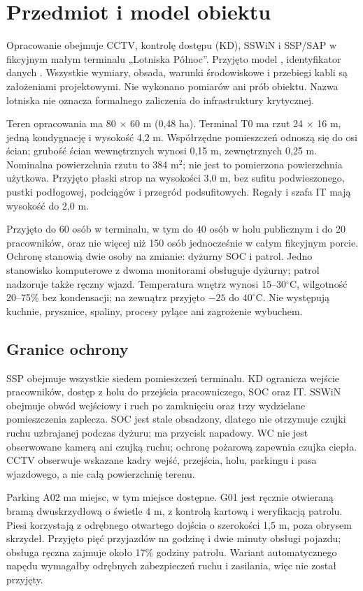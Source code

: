 \section{Przedmiot i model obiektu}
Opracowanie obejmuje CCTV, kontrolę dostępu (KD), SSWiN i SSP/SAP w fikcyjnym małym terminalu „Lotniska Północ”. Przyjęto model \ModelRevision{}, identyfikator danych \texttt{\ModelHash{}}. Wszystkie wymiary, obsada, warunki środowiskowe i przebiegi kabli są założeniami projektowymi. Nie wykonano pomiarów ani prób obiektu. Nazwa lotniska nie oznacza formalnego zaliczenia do infrastruktury krytycznej.

Teren opracowania ma 80 $\times$ 60 m (0,48 ha). Terminal T0 ma rzut 24 $\times$ 16 m, jedną kondygnację i wysokość 4,2 m. Współrzędne pomieszczeń odnoszą się do osi ścian; grubość ścian wewnętrznych wynosi 0,15 m, zewnętrznych 0,25 m. Nominalna powierzchnia rzutu to 384 m$^2$; nie jest to pomierzona powierzchnia użytkowa. Przyjęto płaski strop na wysokości 3,0 m, bez sufitu podwieszonego, pustki podłogowej, podciągów i przegród podsufitowych. Regały i szafa IT mają wysokość do 2,0 m.

Przyjęto do 60 osób w terminalu, w tym do 40 osób w holu publicznym i do 20 pracowników, oraz nie więcej niż 150 osób jednocześnie w całym fikcyjnym porcie. Ochronę stanowią dwie osoby na zmianie: dyżurny SOC i patrol. Jedno stanowisko komputerowe z dwoma monitorami obsługuje dyżurny; patrol nadzoruje także ręczny wjazd. Temperatura wnętrz wynosi 15--30$^\circ$C, wilgotność 20--75\% bez kondensacji; na zewnątrz przyjęto $-25$ do $40^\circ$C. Nie występują kuchnie, prysznice, spaliny, procesy pylące ani zagrożenie wybuchem.

\ModelRooms

\subsection*{Granice ochrony}
SSP obejmuje wszystkie siedem pomieszczeń terminalu. KD ogranicza wejście pracowników, dostęp z holu do przejścia pracowniczego, SOC oraz IT. SSWiN obejmuje obwód wejściowy i ruch po zamknięciu oraz trzy wydzielane pomieszczenia zaplecza. SOC jest stale obsadzony, dlatego nie otrzymuje czujki ruchu uzbrajanej podczas dyżuru; ma przycisk napadowy. WC nie jest obserwowane kamerą ani czujką ruchu; ochronę pożarową zapewnia czujka ciepła. CCTV obserwuje wskazane kadry wejść, przejścia, holu, parkingu i pasa wjazdowego, a nie całą powierzchnię terenu.

Parking A02 ma \ParkingCount{} miejsc, w tym miejsce dostępne. G01 jest ręcznie otwieraną bramą dwuskrzydłową o świetle 4 m, z kontrolą kartową i weryfikacją patrolu. Piesi korzystają z odrębnego otwartego dojścia o szerokości 1,5 m, poza obrysem skrzydeł. Przyjęto pięć przyjazdów na godzinę i dwie minuty obsługi pojazdu; obsługa ręczna zajmuje około 17\% godziny patrolu. Wariant automatycznego napędu wymagałby odrębnych zabezpieczeń ruchu i zasilania, więc nie został przyjęty.

